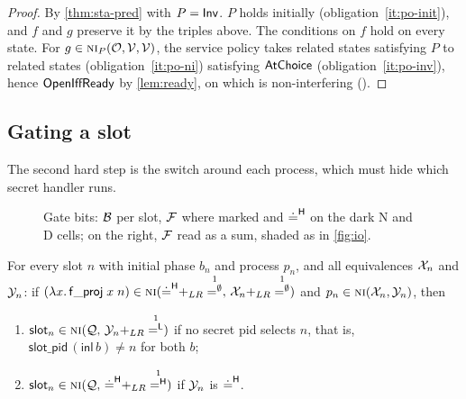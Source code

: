 \begin{proof}
By \cref{thm:sta-pred} with $P = \mathsf{Inv}$. $P$ holds initially
(obligation~\ref{it:po-init}), and
$f$ and $g$ preserve it by the triples above. The conditions on $f$ hold on every state. For
$g \in \text{\normalfont\scshape ni}_P(\mathcal{O},\mathcal{V},\mathcal{V})$, the service policy takes related states satisfying
$P$ to related states (obligation~\ref{it:po-ni}) satisfying $\mathsf{AtChoice}$
(obligation~\ref{it:po-inv}), hence $\mathsf{OpenIffReady}$ by
\cref{lem:ready}, on which  is non-interfering ().
\end{proof}

\subsection{Gating a slot}\label{sec:gating}

The second hard step is the switch around each process, which must hide which secret
handler runs.

\begin{figure}[t]
\centering
\caption{Gate bits: $\mathcal{B}$ per slot, $\mathcal{F}$ where marked and ${\doteq^{\mathsf{H}}}$ on the dark N and
  D cells; on the right, $\mathcal{F}$ read as a sum, shaded as in \cref{fig:io}.}
\label{fig:equivs}
\end{figure}

\begin{lemma}\label{lem:slot}
For every slot $n$ with initial phase $b_n$ and process $p_n$, and all equivalences
$\mathcal{X}_n$ and $\mathcal{Y}_n$: if
$(\lambda x.\,\mathsf{f\_proj}\;x\;n) \in \NI(\priveq +_{LR} \one^\emptyset,\,\Ex_n +_{LR} \one^\emptyset)$
and $p_n \in \text{\normalfont\scshape ni}(\mathcal{X}_n,\mathcal{Y}_n)$, then
\begin{enumerate}
\item $\mathsf{slot}_n \in \NI(\Eq,\,\Ey_n +_{LR} \one^\Lo)$ if no secret pid selects
  $n$, that is, $\mathsf{slot\_pid}\,(\mathsf{inl}\,b) \neq n$ for both $b$;
\item $\mathsf{slot}_n \in \NI(\Eq,\,\priveq +_{LR} \one^\Hi)$ if $\mathcal{Y}_n$ is ${\doteq^{\mathsf{H}}}$.
\end{enumerate}
\end{lemma}

